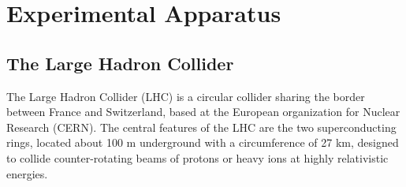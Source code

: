 
\chapter{Experimental Apparatus}
\label{chap:exp}

\section{The Large Hadron Collider}
The Large Hadron Collider (LHC) is a circular collider sharing the border between France and Switzerland, based at the European organization for Nuclear Research (CERN). The central features of the LHC are the two superconducting rings, located about 100 m underground with a circumference of 27 km, designed to collide counter-rotating beams of protons or heavy ions at highly relativistic energies. 